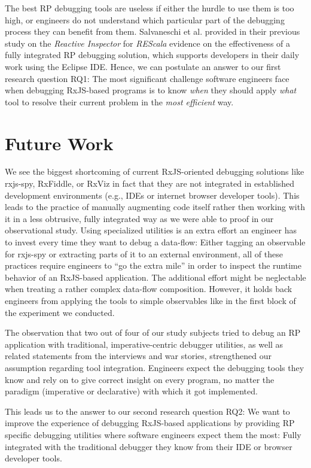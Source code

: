\documentclass[sigplan,screen]{acmart}
\begin{document}
The best RP debugging tools are useless if either the hurdle to use them is too high, or engineers do not understand which particular part of the debugging process they can benefit from them. Salvaneschi et al. \cite{10.1145/2884781.2884815} provided in their previous study on the \emph{Reactive Inspector} for \emph{REScala} evidence on the effectiveness of a fully integrated RP debugging solution, which supports developers in their daily work using the Eclipse IDE. Hence, we can postulate an answer to our first research question RQ1: The most significant challenge software engineers face when debugging RxJS-based programs is to know \emph{when} they should apply \emph{what} tool to resolve their current problem in the \emph{most efficient} way.

\section{Future Work}
\label{sec:future}

We see the biggest shortcoming of current RxJS-oriented debugging solutions like rxjs-spy, RxFiddle, or RxViz in fact that they are not integrated in established development environments (e.g., IDEs or internet browser developer tools). This leads to the practice of manually augmenting code itself rather then working with it in a less obtrusive, fully integrated way as we were able to proof in our observational study. Using specialized utilities is an extra effort an engineer has to invest every time they want to debug a data-flow: Either tagging an observable for rxjs-spy or extracting parts of it to an external environment, all of these practices require engineers to ``go the extra mile'' in order to inspect the runtime behavior of an RxJS-based application. The additional effort might be neglectable when treating a rather complex data-flow composition. However, it holds back engineers from applying the tools to simple observables like in the first block of the experiment we conducted.

The observation that two out of four of our study subjects tried to debug an RP application with traditional, imperative-centric debugger utilities, as well as related statements from the interviews and war stories, strengthened our assumption regarding tool integration. Engineers expect the debugging tools they know and rely on to give correct insight on every program, no matter the paradigm (imperative or declarative) with which it got implemented.

This leads us to the answer to our second research question RQ2: We want to improve the experience of debugging RxJS-based applications by providing RP specific debugging utilities where software engineers expect them the most: Fully integrated with the traditional debugger they know from their IDE or browser developer tools.
\end{document}
